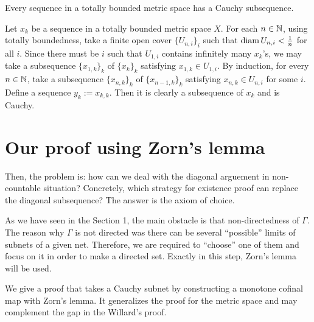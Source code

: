\documentclass{../exp}
\begin{document}
\begin{thm}
Every sequence in a totally bounded metric space has a Cauchy subsequence.
\end{thm}
\begin{pf}
Let $x_k$ be a sequence in a totally bounded metric space $X$.
For each $n\in\mathbb{N}$, using totally boundedness, take a finite open cover $\{U_{n,i}\}_i$ such that $\operatorname{diam} U_{n,i}<\frac1n$ for all $i$.
Since there must be $i$ such that $U_{1,i}$ contains infinitely many $x_k$'s, we may take a subsequence $\{x_{1,k}\}_k$ of $\{x_k\}_k$ satisfying $x_{1,k}\in U_{1,i}$.
By induction, for every $n\in\mathbb{N}$, take a subsequence $\{x_{n,k}\}_k$ of $\{x_{n-1,k}\}_k$ satisfying $x_{n,k}\in U_{n,i}$ for some $i$.
Define a sequence $y_k:=x_{k,k}$.
Then it is clearly a subsequence of $x_k$ and is Cauchy.
\end{pf}


\section{Our proof using Zorn's lemma}

Then, the problem is: how can we deal with the diagonal arguement in non-countable situation?
Concretely, which strategy for existence proof can replace the diagonal subsequence?
The answer is the axiom of choice.

As we have seen in the Section 1, the main obstacle is that non-directedness of $\Gamma$.
The reason why $\Gamma$ is not directed was there can be several ``possible'' limits of subnets of a given net.
Therefore, we are required to ``choose'' one of them and focus on it in order to make a directed set.
Exactly in this step, Zorn's lemma will be used.
 
We give a proof that takes a Cauchy subnet by constructing a monotone cofinal map with Zorn's lemma.
It generalizes the proof for the metric space and may complement the gap in the Willard's proof.
\end{document}
